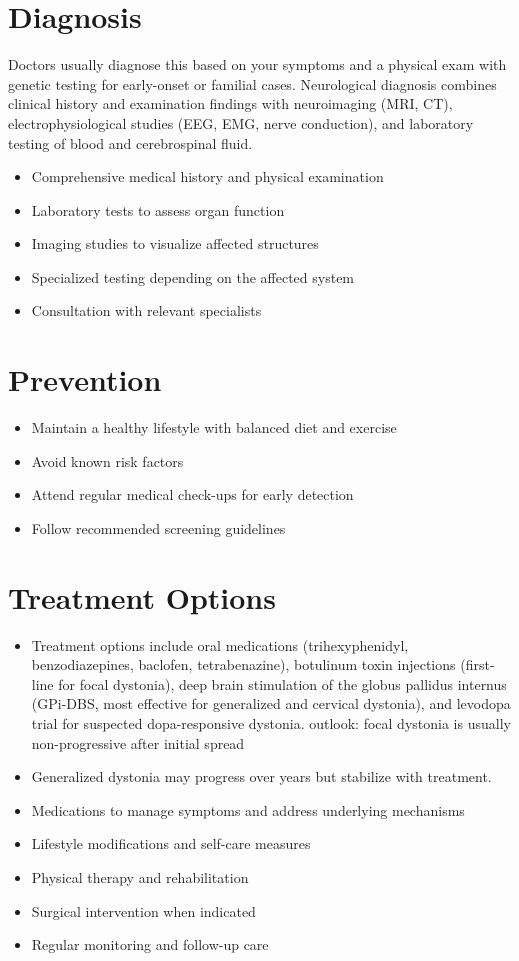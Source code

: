 \section{Diagnosis}
Doctors usually diagnose this based on your symptoms and a physical exam with genetic testing for early-onset or familial cases. Neurological diagnosis combines clinical history and examination findings with neuroimaging (MRI, CT), electrophysiological studies (EEG, EMG, nerve conduction), and laboratory testing of blood and cerebrospinal fluid.

\begin{itemize}[noitemsep]
  \item Comprehensive medical history and physical examination
  \item Laboratory tests to assess organ function
  \item Imaging studies to visualize affected structures
  \item Specialized testing depending on the affected system
  \item Consultation with relevant specialists
\end{itemize}
\section{Prevention}
\begin{itemize}[noitemsep]
  \item Maintain a healthy lifestyle with balanced diet and exercise
  \item Avoid known risk factors
  \item Attend regular medical check-ups for early detection
  \item Follow recommended screening guidelines
\end{itemize}
\section{Treatment Options}
\begin{itemize}[noitemsep]
  \item Treatment options include oral medications (trihexyphenidyl, benzodiazepines, baclofen, tetrabenazine), botulinum toxin injections (first-line for focal dystonia), deep brain stimulation of the globus pallidus internus (GPi-DBS, most effective for generalized and cervical dystonia), and levodopa trial for suspected dopa-responsive dystonia. outlook: focal dystonia is usually non-progressive after initial spread
  \item Generalized dystonia may progress over years but stabilize with treatment.
  \item Medications to manage symptoms and address underlying mechanisms
  \item Lifestyle modifications and self-care measures
  \item Physical therapy and rehabilitation
  \item Surgical intervention when indicated
  \item Regular monitoring and follow-up care
\end{itemize}
